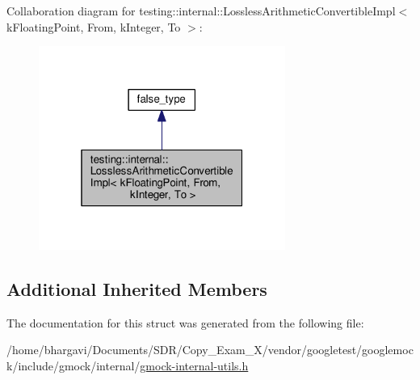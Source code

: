 Collaboration diagram for testing\+:\+:internal\+:\+:Lossless\+Arithmetic\+Convertible\+Impl$<$ k\+Floating\+Point, From, k\+Integer, To $>$\+:
\nopagebreak
\begin{figure}[H]
\begin{center}
\leavevmode
\includegraphics[width=229pt]{structtesting_1_1internal_1_1_lossless_arithmetic_convertible_impl_3_01k_floating_point_00_01_frdb81938a6eea903cc3ea19f69cbddf0d}
\end{center}
\end{figure}
\subsection*{Additional Inherited Members}


The documentation for this struct was generated from the following file\+:\begin{DoxyCompactItemize}
\item 
/home/bhargavi/\+Documents/\+S\+D\+R/\+Copy\+\_\+\+Exam\+\_\+X/vendor/googletest/googlemock/include/gmock/internal/\hyperlink{gmock-internal-utils_8h}{gmock-\/internal-\/utils.\+h}\end{DoxyCompactItemize}
